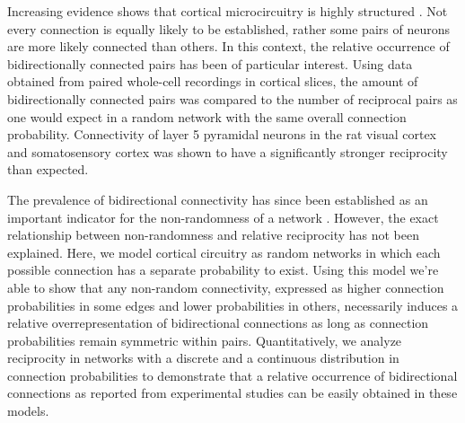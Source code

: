 

Increasing evidence shows that cortical microcircuitry is highly structured \cite{Song2005,Perin2011}. Not every connection is equally likely to be established, rather some pairs of neurons are more likely connected than others. In this context, the relative occurrence of bidirectionally connected pairs has been of particular interest. Using data obtained from paired whole-cell recordings in cortical slices, the amount of bidirectionally connected pairs was compared to the number of reciprocal pairs as one would expect in a random network with the same overall connection probability. Connectivity of layer 5 pyramidal neurons in the rat visual cortex \cite{Song2005} and somatosensory cortex \cite{Markram1997, Perin2011} was shown to have a significantly stronger reciprocity than expected.



The prevalence of bidirectional connectivity has since been established as an important indicator for the non-randomness of a network \cite{Lefort2009, Bourjaily2011}. However, the exact relationship between non-randomness and relative reciprocity has not been explained. Here, we model cortical circuitry as random networks in which each possible connection has a separate probability to exist. Using this model we're able to show that any non-random connectivity, expressed as higher connection probabilities in some edges and lower probabilities in others, necessarily induces a relative overrepresentation of bidirectional connections as long as connection probabilities remain symmetric within pairs. Quantitatively, we analyze reciprocity in networks with a discrete and a continuous distribution in connection probabilities to demonstrate that a relative occurrence of bidirectional connections as reported from experimental studies can be easily obtained in these models.


